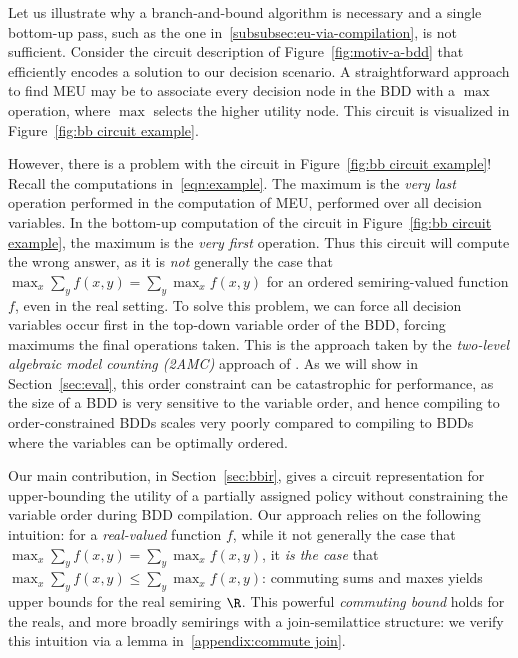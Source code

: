 Let us illustrate why a branch-and-bound algorithm is necessary and
a single bottom-up pass, such as the one in~\cref{subsubsec:eu-via-compilation},
is not sufficient.
Consider the circuit description of Figure~\ref{fig:motiv-a-bdd} that efficiently encodes a
solution to our decision scenario. A
straightforward approach to find MEU may be to associate every decision node in
the BDD with a $\max$ operation,
where $\max$ selects the higher utility node.
This circuit is visualized in Figure~\ref{fig:bb circuit example}.

However, there is a problem with the circuit in Figure~\ref{fig:bb circuit example}!
Recall the computations in~\cref{eqn:example}. The
maximum is the \emph{very last} operation
performed in the computation of MEU, performed over all decision variables.
In the bottom-up computation of the circuit in Figure~\ref{fig:bb circuit example},
the maximum is the \emph{very first} operation.
Thus this circuit will compute the wrong answer, as it is
\emph{not} generally the case that $\max_x \sum_y f(x,y) = \sum_y \max_x f(x,y)$
for an ordered semiring-valued function $f$, even in the real setting.
To solve this problem, we can force all
decision variables occur first in the top-down variable order
of the BDD, forcing maximums the final operations taken.
This is the approach
taken by the \emph{two-level algebraic model counting (2AMC)} approach of
\citet{derkinderen2020algebraic}.
As we will show in Section~\ref{sec:eval},
this order constraint can be catastrophic for performance, as
the size of a BDD is very sensitive to the variable order, and hence compiling
to order-constrained BDDs scales very poorly compared to compiling to BDDs where
the variables can be optimally ordered.

Our main contribution, in Section~\ref{sec:bbir}, gives a circuit representation
for upper-bounding the utility of a partially assigned policy
without constraining the variable order during BDD
compilation.
Our approach relies on the following intuition: for a \emph{real-valued} function $f$,
while it not generally the case that $\max_x \sum_y f(x,y) = \sum_y \max_x f(x,y)$, it
\emph{is the case} that $\max_x \sum_y f(x,y) \le \sum_y \max_x f(x,y)$:
commuting sums and maxes yields upper bounds for the real semiring $\R$.
This powerful \emph{commuting bound} holds for the reals,
and more broadly semirings with
a join-semilattice structure:
we verify this intuition via a lemma in~\cref{appendix:commute join}.


